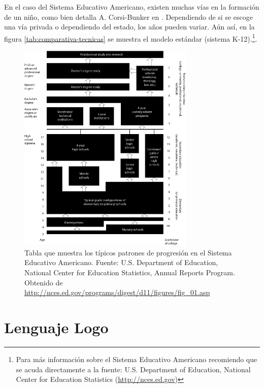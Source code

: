 En el caso del Sistema Educativo Americano, existen muchas vías en la formación de un niño, como bien detalla A. Corsi-Bunker en \cite{guide-education-us}. Dependiendo de si se escoge una vía privada o dependiendo del estado, los años pueden variar. Aún así, en la figura \ref{tab:comparativa-tecnicas} se muestra el modelo estándar (sistema K-12).\footnote{Para más información sobre el Sistema Educativo Americano recomiendo que se acuda directamente a la fuente: U.S. Department of Education, National Center for Education Statistics (\url{http://nces.ed.gov})}.

\begin{figure}[!ht]
	\begin{centering}
		\includegraphics[width=0.75\textwidth]{images/education-usa.png}
			\caption{Tabla que muestra los típicos patrones de progresión en el Sistema Educativo Americano. Fuente: U.S. Department of Education, National Center for Education Statistics, Annual Reports Program. Obtenido de \url{http://nces.ed.gov/programs/digest/d11/figures/fig_01.asp}}
				\label{fig:education-usa}
	\end{centering}
\end{figure}





\chapter{Lenguaje Logo}
\label{anexo:logo-lenguaje}

